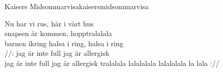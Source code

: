 \begin{song}{Kaisers Midsommarvisa}{kaisersmidsommarvisa}
\begin{vers}
Nu har vi rus, här i vårt hus\\
snapsen är kommen, hopptralalala\\
barnen ikring halsa i ring, halsa i ring\\
//: jag är inte full jag är allergisk\\
jag är inte full jag är allergisk
tralalala lalalalala lalalalala la lala ://\\
\end{vers}
\end{song}

